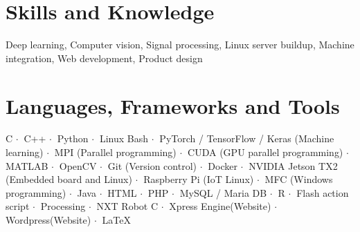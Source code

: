 \documentclass[letterpaper,11pt]{article}
\newcommand{\resumeItem}[2]{
  \item\small{
    \textbf{#1}{: #2 \vspace{-2pt}}
  }
}
\newcommand{\resumeSubItem}[2]{\resumeItem{#1}{#2}\vspace{-4pt}}
\newcommand{\resumeSubHeadingListStart}{\begin{itemize}[leftmargin=*]}
\newcommand{\resumeSubHeadingListEnd}{\end{itemize}}
\begin{document}
\section{Skills and Knowledge}
  Deep learning, Computer vision, Signal processing, Linux server buildup, Machine integration, Web development, Product design
  
\section{Languages, Frameworks and Tools}
  C $\cdot \ $ C++ $\cdot \ $ Python $\cdot \ $ Linux Bash $\cdot \ $ PyTorch / TensorFlow / Keras (Machine learning) $\cdot \ $ MPI (Parallel programming) $\cdot \ $ CUDA (GPU parallel programming) $\cdot \ $ MATLAB $\cdot \ $ OpenCV $\cdot \ $ Git (Version control) $\cdot \ $ Docker $\cdot \ $ NVIDIA Jetson TX2 (Embedded board and Linux) $\cdot \ $ Raspberry Pi (IoT Linux) $\cdot \ $ MFC (Windows programming) $\cdot \ $ Java $\cdot \ $ HTML $\cdot \ $ PHP $\cdot \ $ MySQL / Maria DB $\cdot \ $ R $\cdot \ $ Flash action script $\cdot \ $ Processing $\cdot \ $ NXT Robot C $\cdot \ $ Xpress Engine(Website) $\cdot \ $ Wordpress(Website) $\cdot \ $ \LaTeX
  
  

%

\end{document}

